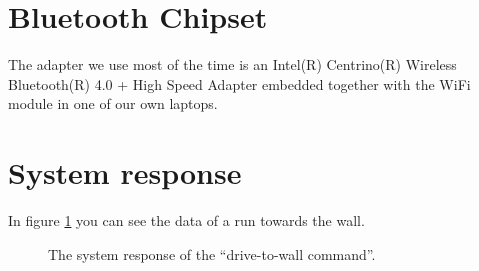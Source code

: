 \documentclass[final]{scrreprt} %
\begin{document}
\section{Bluetooth Chipset}
The adapter we use most of the time is an Intel(R) Centrino(R) Wireless Bluetooth(R) 4.0 + High Speed Adapter embedded together with the WiFi module in one of our own laptops.

\section{System response}
In figure \ref{fig:system-response} you can see the data of a run towards the wall.
\begin{figure}[H]
	\centering
    	\setlength\figureheight{4cm}
    	\setlength{}
    	    	
    	\caption{The system response of the “drive-to-wall command”.}
    	\label{fig:system-response}
\end{figure}
\end{document}
